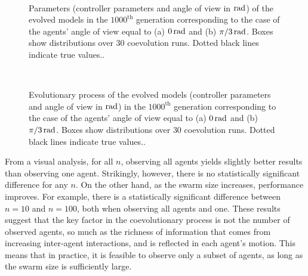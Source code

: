 \begin{figure}[!t]%
	\centering
		\\
		\caption{Parameters (controller parameters and angle of view in $\unit[]{rad}$) of the evolved models in the $1000^\textrm{th}$ generation corresponding to the case of the agents' angle of view equal to (a) $\unit[0]{rad}$ and (b) $\unit[\pi/3]{rad}$. Boxes show distributions over $30$ coevolution runs. Dotted black lines indicate true values..}
		\label{fig:model_parameters_box_aggregation_angle}
\end{figure}
\begin{figure}[!t]%
	\centering
		\\
		\caption{Evolutionary process of the evolved models (controller parameters and angle of view in $\unit[]{rad}$) in the $1000^\textrm{th}$ generation corresponding to the case of the agents' angle of view equal to (a) $\unit[0]{rad}$ and (b) $\unit[\pi/3]{rad}$. Boxes show distributions over $30$ coevolution runs. Dotted black lines indicate true values.. \label{fig:model_parameters_convergence_angleview}}
\end{figure}
From a visual analysis, for all $n$, observing all agents yields slightly better results than observing one agent. Strikingly, however, there is no statistically significant difference for any $n$. On the other hand, as the swarm size increases, performance improves. For example, there is a statistically significant difference between $n=10$ and $n=100$, both when observing all agents and one. These results suggest that the key factor in the coevolutionary process is not the number of observed agents, so much as the richness of information that comes from increasing inter-agent interactions, and is reflected in each agent's motion. This means that in practice, it is feasible to observe only a subset of agents, as long as the swarm size is sufficiently large.

